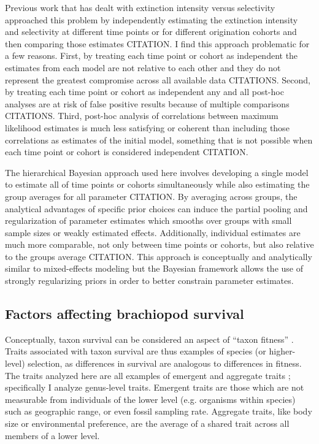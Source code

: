 \documentclass{article}
\begin{document}
Previous work that has dealt with extinction intensity versus selectivity approached this problem by independently estimating the extinction intensity and selectivity at different time points or for different origination cohorts and then comparing those estimates CITATION. I find this approach problematic for a few reasons. First, by treating each time point or cohort as independent the estimates from each model are not relative to each other and they do not represent the greatest compromise across all available data CITATIONS. Second, by treating each time point or cohort as independent any and all post-hoc analyses are at risk of false positive results because of multiple comparisons CITATIONS. Third, post-hoc analysis of correlations between maximum likelihood estimates is much less satisfying or coherent than including those correlations as estimates of the initial model, something that is not possible when each time point or cohort is considered independent CITATION. 

The hierarchical Bayesian approach used here involves developing a single model to estimate all of time points or cohorts simultaneously while also estimating the group averages for all parameter CITATION. By averaging across groups, the analytical advantages of specific prior choices can induce the partial pooling and regularization of parameter estimates which smooths over groups with small sample sizes or weakly estimated effects. Additionally, individual estimates are much more comparable, not only between time points or cohorts, but also relative to the groups average CITATION. This approach is conceptually and analytically similar to mixed-effects modeling but the Bayesian framework allows the use of strongly regularizing priors in order to better constrain parameter estimates.




\subsection{Factors affecting brachiopod survival}

Conceptually, taxon survival can be considered an aspect of ``taxon fitness'' \citep{Cooper1984,Palmer2012}. Traits associated with taxon survival are thus examples of species (or higher-level) selection, as differences in survival are analogous to differences in fitness. The traits analyzed here are all examples of emergent and aggregate traits \citep{Jablonski2008a,Rabosky2010b}; specifically I analyze genus-level traits. Emergent traits are those which are not measurable from individuals of the lower level (e.g. organisms within species) such as geographic range, or even fossil sampling rate. Aggregate traits, like body size or environmental preference, are the average of a shared trait across all members of a lower level.
\end{document}
